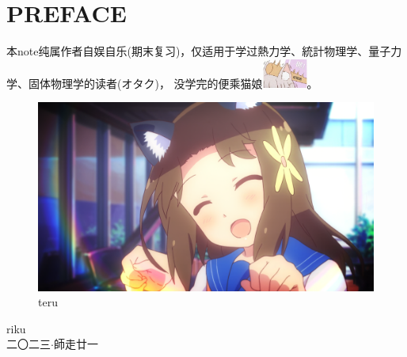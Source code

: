 \chapter*{PREFACE}

本note纯属作者自娱自乐(期末复习)，仅适用于学过熱力学、統計物理学、量子力学、固体物理学的读者(オタク)，\vspace{1ex}
没学完的便乘猫娘\includegraphics[width=4em,align=c]{idiot.jpg}。
\begin{figure}[ht]
    \centering
    \includegraphics[width=\linewidth]{teru.png}
    \caption*{teru}
    \label{fig:teru-star}
\end{figure}

\begin{flushright}
	riku \\
	二〇二三$\cdot$師走廿一\\
\end{flushright}

